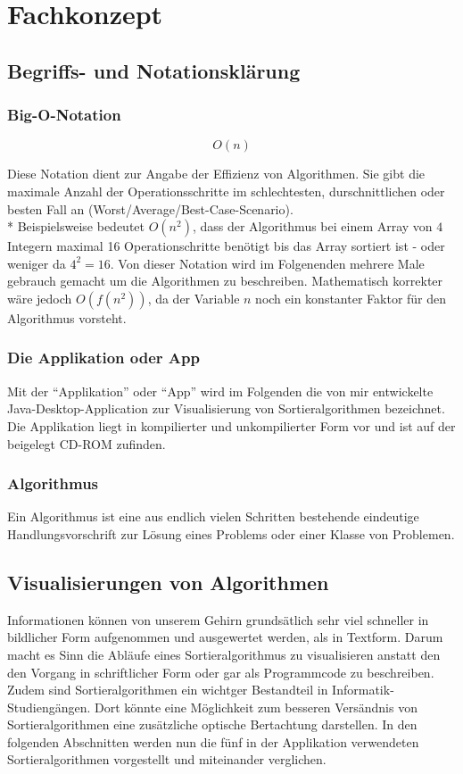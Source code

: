 \chapter{Fachkonzept}
\section{Begriffs- und Notationsklärung}
\subsection{Big-O-Notation}
{\Huge{$$ O(n) $$}}

Diese Notation dient zur Angabe der Effizienz von Algorithmen. Sie gibt die maximale Anzahl der Operationsschritte
 im schlechtesten, durschnittlichen oder besten Fall an (Worst/Average/Best-Case-Scenario).\\*
Beispielsweise bedeutet $O(n^2)$, dass der Algorithmus bei einem Array von $4$ Integern maximal 16 Operationschritte
benötigt bis das Array sortiert ist - oder weniger da $4^2 = 16$.
Von dieser Notation wird im Folgenenden mehrere Male gebrauch gemacht um die Algorithmen zu beschreiben.
Mathematisch korrekter wäre jedoch $O(f(n^2))$, da der Variable $n$ noch ein konstanter Faktor für den Algorithmus vorsteht.
\subsection{Die Applikation oder App}
Mit der "`Applikation"' oder "`App"' wird im Folgenden die von mir entwickelte Java-Desktop-Application zur Visualisierung von 
Sortieralgorithmen bezeichnet. Die Applikation liegt in kompilierter und unkompilierter Form vor und ist auf der beigelegt CD-ROM
zufinden.
\subsection{Algorithmus}
\begin{munquote}
Ein Algorithmus ist eine aus endlich vielen Schritten bestehende eindeutige Handlungsvorschrift zur Lösung eines Problems 
oder einer Klasse von Problemen.
\end{munquote}
\section{Visualisierungen von Algorithmen}
Informationen können von unserem Gehirn grundsätlich sehr viel schneller in bildlicher Form aufgenommen und ausgewertet werden, als in Textform.
Darum macht es Sinn die Abläufe eines Sortieralgorithmus zu visualisieren anstatt den den Vorgang in schriftlicher Form oder gar als Programmcode zu beschreiben.
Zudem sind Sortieralgorithmen ein wichtger Bestandteil in Informatik-Studiengängen. Dort könnte eine Möglichkeit zum besseren Versändnis von Sortieralgorithmen
 eine zusätzliche optische Bertachtung darstellen. In den folgenden Abschnitten werden nun die fünf in der Applikation verwendeten Sortieralgorithmen vorgestellt und 
miteinander verglichen.  
